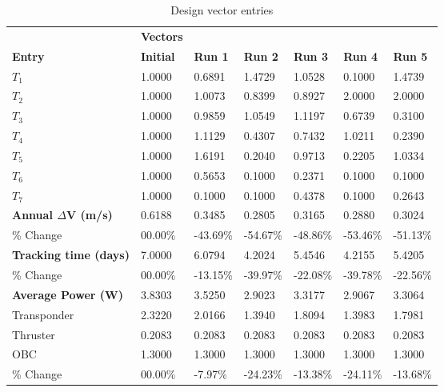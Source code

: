 \begin{table}[H]
\centering
\begin{tabular}{lllllll}
\textbf{} & \cellcolor[HTML]{EFEFEF}\textbf{Vectors} & \textbf{} & \textbf{} & \textbf{} & \textbf{} & \textbf{} \\
\rowcolor[HTML]{EFEFEF} \cellcolor[HTML]{EFEFEF}\textbf{Entry} & \cellcolor[HTML]{EFEFEF}\textbf{Initial} & \cellcolor[HTML]{EFEFEF}\textbf{Run 1} & \cellcolor[HTML]{EFEFEF}\textbf{Run 2} & \cellcolor[HTML]{EFEFEF}\textbf{Run 3} & \cellcolor[HTML]{EFEFEF}\textbf{Run 4} & \cellcolor[HTML]{EFEFEF}\textbf{Run 5} \\
$T_{1}$ & 1.0000 & 0.6891 & 1.4729 & 1.0528 & 0.1000 & 1.4739 \\
$T_{2}$ & 1.0000 & 1.0073 & 0.8399 & 0.8927 & 2.0000 & 2.0000 \\
$T_{3}$ & 1.0000 & 0.9859 & 1.0549 & 1.1197 & 0.6739 & 0.3100 \\
$T_{4}$ & 1.0000 & 1.1129 & 0.4307 & 0.7432 & 1.0211 & 0.2390 \\
$T_{5}$ & 1.0000 & 1.6191 & 0.2040 & 0.9713 & 0.2205 & 1.0334 \\
$T_{6}$ & 1.0000 & 0.5653 & 0.1000 & 0.2371 & 0.1000 & 0.1000 \\
$T_{7}$ & 1.0000 & 0.1000 & 0.1000 & 0.4378 & 0.1000 & 0.2643 \\
\rowcolor[HTML]{EFEFEF} 
\cellcolor[HTML]{EFEFEF}\textbf{Annual $\Delta \boldsymbol{V}$ (m/s)} & \cellcolor[HTML]{EFEFEF}0.6188 & 0.3485 & 0.2805 & 0.3165 & 0.2880 & 0.3024 \\
\% Change & 00.00\% &-43.69\% & -54.67\% & -48.86\% & -53.46\% & -51.13\% \\
\rowcolor[HTML]{EFEFEF} 
\cellcolor[HTML]{EFEFEF}\textbf{Tracking time (days)} & \cellcolor[HTML]{EFEFEF}7.0000 & 6.0794 & 4.2024 & 5.4546 & 4.2155 & 5.4205 \\
\% Change & 00.00\% &-13.15\% & -39.97\% & -22.08\% & -39.78\% & -22.56\% \\
\rowcolor[HTML]{EFEFEF} 
\cellcolor[HTML]{EFEFEF}\textbf{Average Power (W)} & \cellcolor[HTML]{EFEFEF}3.8303 & 3.5250 & 2.9023 & 3.3177 & 2.9067 & 3.3064 \\
Transponder & 2.3220 & 2.0166 & 1.3940 & 1.8094 & 1.3983 & 1.7981 \\
Thruster & 0.2083 & 0.2083 & 0.2083 & 0.2083 & 0.2083 & 0.2083 \\
OBC & 1.3000 & 1.3000 & 1.3000 & 1.3000 & 1.3000 & 1.3000 \\
\% Change & 00.00\% &-7.97\% & -24.23\% & -13.38\% & -24.11\% & -13.68\% \\
\end{tabular}
\caption{Design vector entries}
\label{tab:DesignVectorEntries_default28dur1len3intSHSRP}
\end{table}